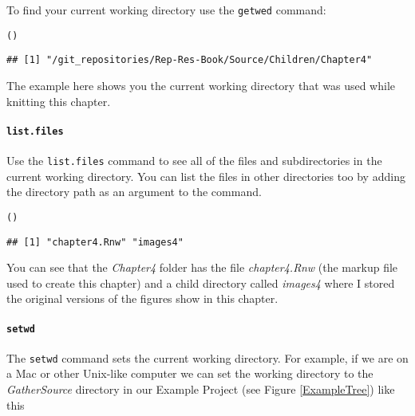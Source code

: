 To find your current working directory use the \texttt{getwed} command:

\begin{knitrout}
\color{fgcolor}\begin{kframe}
\begin{alltt}
()
\end{alltt}
\begin{verbatim}
## [1] "/git_repositories/Rep-Res-Book/Source/Children/Chapter4"
\end{verbatim}
\end{kframe}
\end{knitrout}


\noindent The example here shows you the current working directory that was used while knitting this chapter.

\paragraph{{\tt{list.files}}}

Use the \texttt{list.files} command to see all of the files and subdirectories in the current working directory. You can list the files in other directories too by adding the directory path as an argument to the command. 

\begin{knitrout}
\color{fgcolor}\begin{kframe}
\begin{alltt}
()
\end{alltt}
\begin{verbatim}
## [1] "chapter4.Rnw" "images4"
\end{verbatim}
\end{kframe}
\end{knitrout}


\noindent You can see that the \emph{Chapter4} folder has the file \emph{chapter4.Rnw} (the markup file used to create this chapter) and a child directory called \emph{images4} where I stored the original versions of the figures show in this chapter.

\paragraph{{\tt{setwd}}}

The {\tt{setwd}} command sets the current working directory. For example, if we are on a Mac or other Unix-like computer we can set the working directory to the {\emph{GatherSource}} directory in our Example Project (see Figure \ref{ExampleTree}) like this

